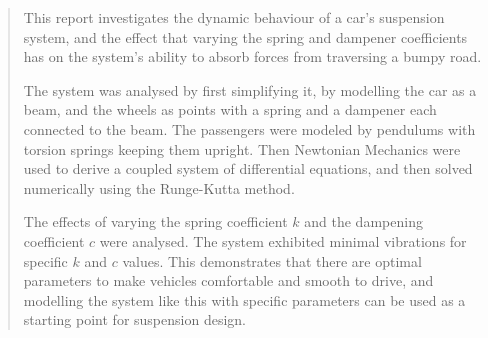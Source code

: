 \begin{abstract}

This report investigates the dynamic behaviour of a car's suspension system, and the effect that varying the spring and dampener coefficients has on the system's ability to absorb forces from traversing a bumpy road.

The system was analysed by first simplifying it, by modelling the car as a beam, and the wheels as points with a spring and a dampener each connected to the beam. The passengers were modeled by pendulums with torsion springs keeping them upright. Then Newtonian Mechanics were used to derive a coupled system of differential equations, and then solved numerically using the Runge-Kutta method.

The effects of varying the spring coefficient $k$ and the dampening coefficient $c$ were analysed. The system exhibited minimal vibrations for specific $k$ and $c$ values. This demonstrates that there are optimal parameters to make vehicles comfortable and smooth to drive, and modelling the system like this with specific parameters can be used as a starting point for suspension design.
\end{abstract}